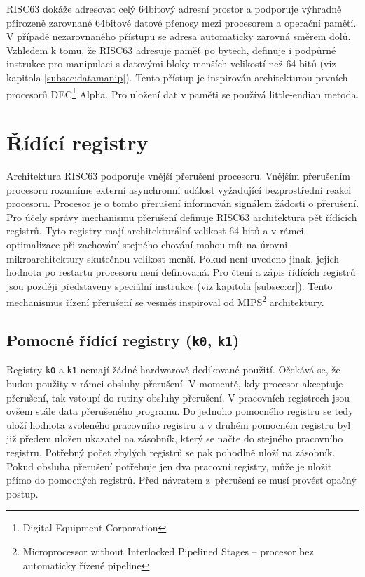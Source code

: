 \documentclass[
  digital, %
  color,   %
  table,   %
  twoside, %
  nolof,   %
  nolot,   %
]{fithesis3}
\begin{document}
RISC63 dokáže adresovat celý 64bitový adresní prostor a podporuje výhradně přirozeně zarovnané 64bitové datové přenosy mezi procesorem a operační pamětí. V případě nezarovnaného přístupu se adresa automaticky zarovná směrem dolů. Vzhledem k tomu, že RISC63 adresuje paměť po bytech, definuje i podpůrné instrukce pro manipulaci s datovými bloky menších velikostí než 64 bitů (viz kapitola \ref{subsec:datamanip}). Tento přístup je inspirován architekturou prvních procesorů DEC\footnote{Digital Equipment Corporation} Alpha. Pro uložení dat v paměti se používá little-endian metoda.

\section{Řídící registry}
Architektura RISC63 podporuje vnější přerušení procesoru. Vnějším přerušením procesoru rozumíme externí asynchronní událost vyžadující bezprostřední reakci procesoru. Procesor je o tomto přerušení informován signálem žádosti o přerušení. Pro účely správy mechanismu přerušení definuje RISC63 architektura pět řídících registrů. Tyto registry mají architekturální velikost 64 bitů a v rámci optimalizace při zachování stejného chování mohou mít na úrovni mikroarchitektury skutečnou velikost menší. Pokud není uvedeno jinak, jejich hodnota po restartu procesoru není definovaná. Pro čtení a zápis řídících registrů jsou později představeny speciální instrukce (viz kapitola \ref{subsec:cr}). Tento mechanismus řízení přerušení se vesměs inspiroval od MIPS\footnote{Microprocessor without Interlocked Pipelined Stages -- procesor bez automaticky řízené pipeline} architektury.

\subsection{Pomocné řídící registry (\texttt{k0}, \texttt{k1})}
Registry \texttt{k0} a \texttt{k1} nemají žádné hardwarově dedikované použití. Očekává se, že budou použity v rámci obsluhy přerušení. V momentě, kdy procesor akceptuje přerušení, tak vstoupí do rutiny obsluhy přerušení. V pracovních registrech jsou ovšem stále data přerušeného programu. Do jednoho pomocného registru se tedy uloží hodnota zvoleného pracovního registru a v druhém pomocném registru byl již předem uložen ukazatel na zásobník, který se načte do stejného pracovního registru. Potřebný počet zbylých registrů se pak pohodlně uloží na zásobník. Pokud obsluha přerušení potřebuje jen dva pracovní registry, může je uložit přímo do pomocných registrů. Před návratem z~přerušení se musí provést opačný postup.
\end{document}
